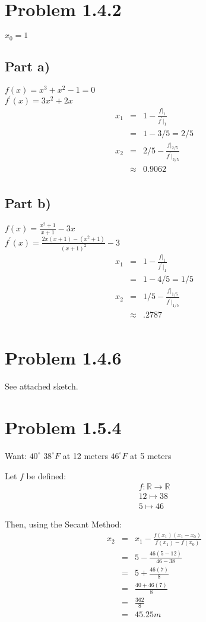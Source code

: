 \documentclass[12pt]{article}
\begin{document}
\section*{Problem 1.4.2}
\(x_{0} = 1\)
\subsection*{Part a)}
\(f(x) = x^3 + x^2 - 1 = 0\)\\
\(f^{'}(x) = 3x^2 + 2x\)\\
\begin{eqnarray*}
x_{1} & = & 1 - \frac{f|_{1}}{f^{'}|_{1}}\\
& = & 1 - 3/5 = 2/5\\
x_{2} & = & 2/5 - \frac{f|_{2/5}}{f^{'}|_{2/5}}\\
& \approx & 0.9062\\
\end{eqnarray*}

\subsection*{Part b)}
\(f(x) = \frac{x^2 + 1}{x + 1} - 3x\)\\
\(f^{'}(x) = \frac{2x(x+1) - (x^2 + 1)}{(x+1)^2} - 3\)\\
\begin{eqnarray*}
x_{1} & = & 1 - \frac{f|_{1}}{f^{'}|_{1}}\\
& = & 1 - 4/5 = 1/5\\
x_{2} & = & 1/5 - \frac{f|_{1/5}}{f^{'}|_{1/5}}\\
& \approx & .2787\\
\end{eqnarray*}
\section*{Problem 1.4.6}
See attached sketch.
\section*{Problem 1.5.4}
Want: \(40^{{\circ}}\)
\(38^{{\circ}}F\) at 12 meters
\(46^{{\circ}}F\) at 5 meters

Let \(f\) be defined:
\begin{eqnarray*}
f: \mathbb{R} \rightarrow \mathbb{R}\\
12 \mapsto 38\\
5 \mapsto 46\\
\\
\end{eqnarray*}
Then, using the Secant Method:
\begin{eqnarray*}
x_{2} & = & x_{1} - \frac{f(x_{1})(x_{1} - x_{0})}{f(x_{1}) - f(x_{0})}\\
& = & 5 - \frac{46(5 - 12)}{46-38}\\
& = & 5 + \frac{46(7)}{8}\\
& = & \frac{40 + 46(7)}{8}\\
& = & \frac{362}{8}\\
& = & 45.25m\\
\end{eqnarray*}
\end{document}
